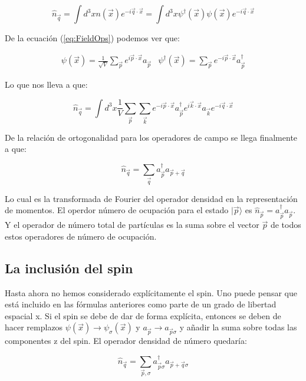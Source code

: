 \documentclass{article} %
\begin{document}
\begin{equation}
\hat{n}_{\vec{q}} = \int d^3x n(\vec{x})e^{-i \vec{q} \cdot \vec{x}} = \int d^3x \psi^{\dagger} (\vec{x}) \psi (\vec{x}) e^{-i \vec{q} \cdot \vec{x}}
\end{equation}

De la ecuación (\ref{eq:FieldOps}) podemos ver que:

$$
\begin{array}{cc}
\psi (\vec{x}) = \frac{1}{\sqrt{V}} \sum_{\vec{p}}e^{i \vec{p} \cdot \vec{x}} a_{\vec{p}} & \psi^{\dagger} (\vec{x}) = \sum_{\vec{p}} e^{-i \vec{p} \cdot \vec{x}} a^{\dagger}_{\vec{p}}
\end{array}
$$

Lo que nos lleva a que:

$$
\hat{n}_{\vec{q}} = \int d^3x \frac{1}{V} \sum_{\vec{p}} \sum_{\vec{k}} e^{-i\vec{p}\cdot\vec{x}}a^{\dagger}_{\vec{p}}e^{i\vec{k}\cdot\vec{x}}a_{\vec{k}}e^{-i\vec{q}\cdot\vec{x}}
$$

De la relación de ortogonalidad para los operadores de campo se llega finalmente a que:

\begin{equation}
\hat{n}_{\vec{q}} = \sum_{\vec{q}} a_{\vec{p}}^{\dagger} a_{\vec{p}+\vec{q}}
\end{equation}

Lo cual es la transformada de Fourier del operador densidad en la representación de momentos. El operdor número de ocupación para el estado $|\vec{p}\rangle$ es $\hat{n}_{\vec{p}} = a^{\dagger}_{\vec{p}} a_{\vec{p}}$. Y el operador de número total de partículas es la suma sobre el vector $\vec{p}$ de todos estos operadores de número de ocupación.

\subsection{La inclusión del spin}

Hasta ahora no hemos considerado explícitamente el spin. Uno puede pensar que está incluido en las fórmulas anteriores como parte de un grado de libertad espacial x. Si el spin se debe de dar de forma explícita, entonces se deben de  hacer remplazos $\psi(\vec{x}) \rightarrow \psi_{\sigma}(\vec{x})$ y $a_{\vec{p}} \rightarrow a_{\vec{p}\sigma}$ y añadir la suma sobre todas las componentes z del spin. El operador densidad de número quedaría:

$$
\hat{n}_{\vec{q}} = \sum_{\vec{p}, \sigma} a^{\dagger}_{\vec{p}\sigma} a_{\vec{p}+\vec{q}\sigma}
$$
\end{document}
